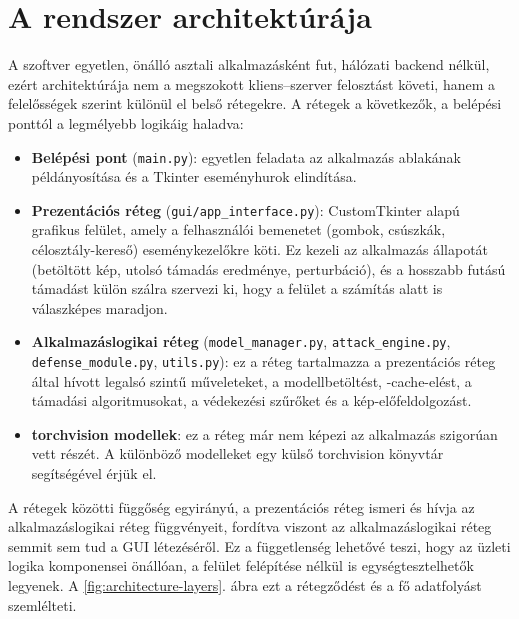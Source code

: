 \section{A rendszer architektúrája}
A szoftver egyetlen, önálló asztali alkalmazásként fut, hálózati backend nélkül, ezért architektúrája nem a megszokott 
kliens--szerver felosztást követi, hanem a felelősségek szerint különül el belső rétegekre. 
A rétegek a következők, a belépési ponttól a legmélyebb logikáig haladva: 

\begin{itemize}
  \item \textbf{Belépési pont} (\texttt{main.py}): egyetlen feladata az alkalmazás ablakának példányosítása és a Tkinter 
        eseményhurok elindítása. 
  \item \textbf{Prezentációs réteg} (\texttt{gui/app\_interface.py}): CustomTkinter alapú grafikus felület, amely a felhasználói 
        bemenetet (gombok, csúszkák, célosztály-kereső) eseménykezelőkre köti. 
        Ez kezeli az alkalmazás állapotát (betöltött kép, utolsó támadás eredménye, perturbáció), és a hosszabb futású támadást 
        külön szálra szervezi ki, hogy a felület a számítás alatt is válaszképes maradjon. 
  \item \textbf{Alkalmazáslogikai réteg} (\texttt{model\_manager.py}, \texttt{attack\_engine.py}, \texttt{defense\_module.py}, 
        \texttt{utils.py}): ez a réteg tartalmazza a prezentációs réteg által hívott legalsó szintű műveleteket, a 
        modellbetöltést, -cache-elést, a támadási algoritmusokat, a védekezési szűrőket és a kép-előfeldolgozást. 
  \item \textbf{torchvision modellek}: ez a réteg már nem képezi az alkalmazás szigorúan vett részét. 
        A különböző modelleket egy külső torchvision könyvtár segítségével érjük el. 
\end{itemize}

A rétegek közötti függőség egyirányú, a prezentációs réteg ismeri és hívja az alkalmazáslogikai réteg függvényeit, fordítva 
viszont az alkalmazáslogikai réteg semmit sem tud a GUI létezéséről. 
Ez a függetlenség lehetővé teszi, hogy az üzleti logika komponensei önállóan, a felület felépítése nélkül is egységtesztelhetők 
legyenek. 
A \ref{fig:architecture-layers}. ábra ezt a rétegződést és a fő adatfolyást szemlélteti. 


